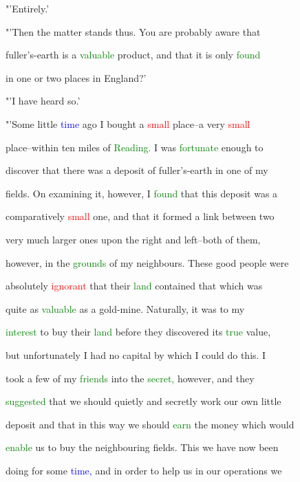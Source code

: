  "'Entirely.'



 "'Then the matter stands thus. You are probably aware that

 fuller's-earth is a \textcolor{green}{valuable} product, and that it is only \textcolor{green}{found}

 in one or two places in England?'



 "'I have heard so.'



 "'Some little \textcolor{blue}{time} ago I bought a \textcolor{red}{small} place--a very \textcolor{red}{small}

 place--within ten miles of \textcolor{green}{Reading.} I was \textcolor{green}{fortunate} enough to

 discover that there was a deposit of fuller's-earth in one of my

 fields. On examining it, however, I \textcolor{green}{found} that this deposit was a

 comparatively \textcolor{red}{small} one, and that it formed a link between two

 very much larger ones upon the right and left--both of them,

 however, in the \textcolor{green}{grounds} of my neighbours. These \textcolor{BurntOrange}{good} people were

 absolutely \textcolor{red}{ignorant} that their \textcolor{green}{land} contained that which was

 quite as \textcolor{green}{valuable} as a gold-mine. Naturally, it was to my

 \textcolor{green}{interest} to buy their \textcolor{green}{land} before they discovered its \textcolor{green}{true} value,

 but unfortunately I had no capital by which I could do this. I

 took a few of my \textcolor{green}{friends} into the \textcolor{green}{secret,} however, and they

 \textcolor{green}{suggested} that we should quietly and secretly work our own little

 deposit and that in this way we should \textcolor{green}{earn} the \textcolor{BurntOrange}{money} which would

 \textcolor{green}{enable} us to buy the neighbouring fields. This we have now been

 doing for some \textcolor{blue}{time,} and in order to help us in our \textcolor{BurntOrange}{operations} we


